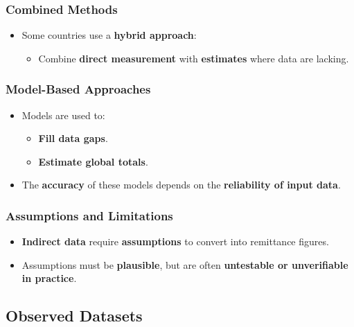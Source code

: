 \documentclass[
  11pt,
]{article}
\providecommand{\tightlist}{%
  \setlength{\itemsep}{0pt}\setlength{\parskip}{0pt}}
\begin{document}
\subsubsection{Combined Methods}\label{combined-methods}

\begin{itemize}
\tightlist
\item
  Some countries use a \textbf{hybrid approach}:

  \begin{itemize}
  \tightlist
  \item
    Combine \textbf{direct measurement} with \textbf{estimates} where
    data are lacking.
  \end{itemize}
\end{itemize}

\subsubsection{Model-Based Approaches}\label{model-based-approaches}

\begin{itemize}
\tightlist
\item
  Models are used to:

  \begin{itemize}
  \tightlist
  \item
    \textbf{Fill data gaps}.
  \item
    \textbf{Estimate global totals}.
  \end{itemize}
\item
  The \textbf{accuracy} of these models depends on the
  \textbf{reliability of input data}.
\end{itemize}

\subsubsection{Assumptions and
Limitations}\label{assumptions-and-limitations}

\begin{itemize}
\tightlist
\item
  \textbf{Indirect data} require \textbf{assumptions} to convert into
  remittance figures.
\item
  Assumptions must be \textbf{plausible}, but are often
  \textbf{untestable or unverifiable in practice}.
\end{itemize}

\subsection{Observed Datasets}\label{observed-datasets}
\end{document}
